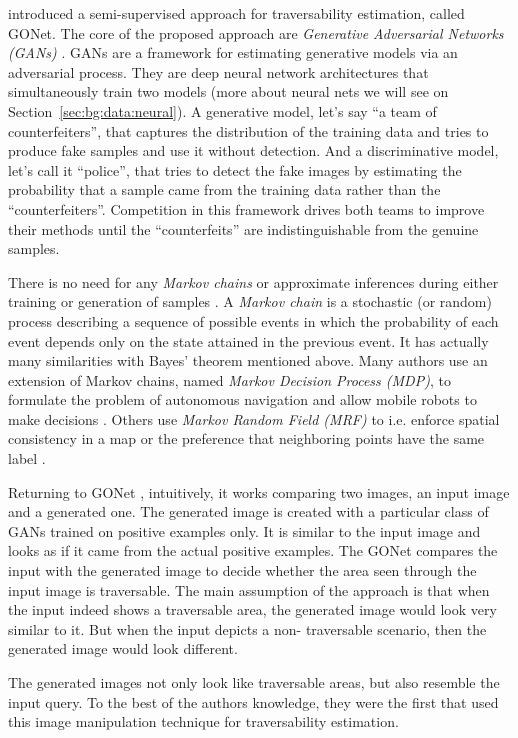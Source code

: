 \documentclass[12pt,a4paper]{report}
\newcommand{\alleg}{\enquote}
\newcommand{\term}{\textit}
\newcommand{\acronym}{\MakeUppercase}
\begin{document}
	\citet{HiroseGonet} introduced a semi-supervised approach for traversability 
	estimation, called GONet. The core of the proposed approach are \term{Generative 
	Adversarial Networks (\acronym{gan}s)} \citep{Goodfellow}. \acronym{gan}s are a 
	framework for estimating generative models via an adversarial process. They 
	are deep neural network architectures that simultaneously train two models (more 
	about neural nets we will see on Section~\ref{sec:bg:data:neural}). A generative 
	model, let's say \alleg{a team of counterfeiters}, that captures the distribution 
	of the training data and tries to produce fake samples and use it without detection. 
	And a discriminative model, let's call it \alleg{police}, that tries to detect 
	the fake images by estimating the probability that a sample came from the training 
	data rather than the \alleg{counterfeiters}. Competition in this framework drives 
	both teams to improve their methods until the \alleg{counterfeits} are 
	indistinguishable from the genuine samples.
	\par
	There is no need for any \term{Markov chains} or approximate inferences during 
	either training or generation of samples \citep{Goodfellow}. A \term{Markov chain} 
	is a stochastic (or random) process describing a sequence of possible events in 
	which the probability of each event depends only on the state attained in the 
	previous event. It has actually many similarities with Bayes' theorem mentioned 
	above. Many authors use an extension of Markov chains, named \term{Markov Decision 
	Process (\acronym{mdp})}, to formulate the problem of autonomous navigation and 
	allow mobile robots to make decisions \citep{Wigness, Zhelo}. Others use 
	\term{Markov Random Field (\acronym{mrf})} \citep{Li} to i.e. enforce spatial 
	consistency in a map or the preference that neighboring points have the same label 
	\citep{Lalonde}.
	\par
	Returning to GONet \citep{HiroseGonet}, intuitively, it works comparing two images, 
	an input image and a generated one. The generated image is created with a 
	particular class of \acronym{gan}s trained on positive examples only. It is 
	similar to the input image and looks as if it came from the actual positive 
	examples. The GONet compares the input with the generated image to decide whether 
	the area seen through the input image is traversable. The main assumption of 
	the approach is that when the input indeed shows a traversable area, the 
	generated image would look very similar to it. But when the input depicts a non-
	traversable scenario, then the generated image would look different.
	\par
	The generated images not only look like	traversable areas, but also resemble the 
	input query. To the best of the authors knowledge, they were the first that used 
	this image manipulation technique for traversability estimation.
	\\\\
	
\end{document}
